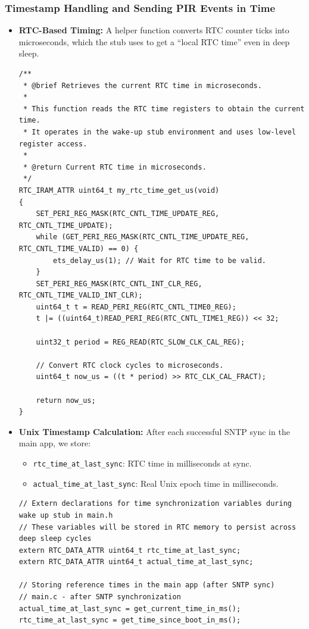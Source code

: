 \documentclass[A4,10pt]{article}
\begin{document}
\subsubsection{Timestamp Handling and Sending PIR Events in Time}
\begin{itemize}
    \item \textbf{RTC-Based Timing:} A helper function converts RTC counter ticks into microseconds, which the stub uses to get a ``local RTC time'' even in deep sleep.
	\begin{verbatim}
/**
 * @brief Retrieves the current RTC time in microseconds.
 *
 * This function reads the RTC time registers to obtain the current time.
 * It operates in the wake-up stub environment and uses low-level register access.
 *
 * @return Current RTC time in microseconds.
 */
RTC_IRAM_ATTR uint64_t my_rtc_time_get_us(void)
{
    SET_PERI_REG_MASK(RTC_CNTL_TIME_UPDATE_REG, RTC_CNTL_TIME_UPDATE);
    while (GET_PERI_REG_MASK(RTC_CNTL_TIME_UPDATE_REG, RTC_CNTL_TIME_VALID) == 0) {
        ets_delay_us(1); // Wait for RTC time to be valid.
    }
    SET_PERI_REG_MASK(RTC_CNTL_INT_CLR_REG, RTC_CNTL_TIME_VALID_INT_CLR);
    uint64_t t = READ_PERI_REG(RTC_CNTL_TIME0_REG);
    t |= ((uint64_t)READ_PERI_REG(RTC_CNTL_TIME1_REG)) << 32;

    uint32_t period = REG_READ(RTC_SLOW_CLK_CAL_REG);

    // Convert RTC clock cycles to microseconds.
    uint64_t now_us = ((t * period) >> RTC_CLK_CAL_FRACT);

    return now_us;
}
	\end{verbatim}
    \item \textbf{Unix Timestamp Calculation:} After each successful SNTP sync in the main app, we store:
        \begin{itemize}
            \item \texttt{rtc\_time\_at\_last\_sync}: RTC time in milliseconds at sync.
            \item \texttt{actual\_time\_at\_last\_sync}: Real Unix epoch time in milliseconds.
        \end{itemize}
\begin{verbatim}
// Extern declarations for time synchronization variables during wake up stub in main.h
// These variables will be stored in RTC memory to persist across deep sleep cycles
extern RTC_DATA_ATTR uint64_t rtc_time_at_last_sync;
extern RTC_DATA_ATTR uint64_t actual_time_at_last_sync;

// Storing reference times in the main app (after SNTP sync)
// main.c - after SNTP synchronization
actual_time_at_last_sync = get_current_time_in_ms();
rtc_time_at_last_sync = get_time_since_boot_in_ms();


\end{verbatim}
\end{itemize}
\end{document}

